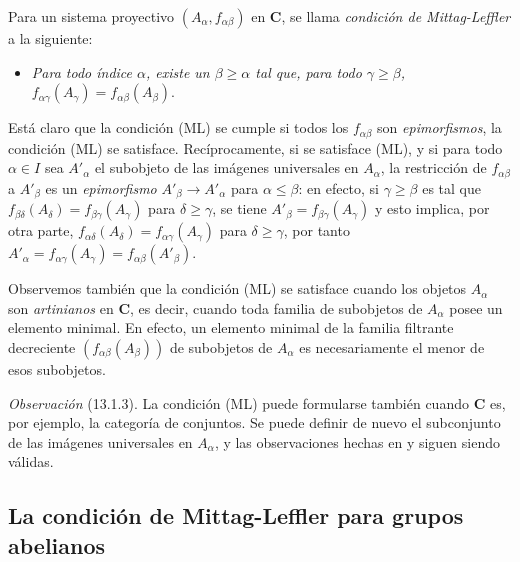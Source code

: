 \begin{env}[13.1.2]
\label{0.13.1.2}
\label{0.13.1.2-fr}
Para un sistema proyectivo $(A_\alpha,f_{\alpha\beta})$ en $\boldsymbol{C}$,
se llama \emph{condición de Mittag-Leffler} a la siguiente:
\begin{itemize}
  \item[(ML)]
  \emph{Para todo índice $\alpha$, existe un $\beta\geq\alpha$ tal
  que, para todo $\gamma\geq\beta$,}
  $f_{\alpha\gamma}(A_\gamma)=f_{\alpha\beta}(A_\beta)$.
\end{itemize}

Está claro que la condición (ML) se cumple si todos los
$f_{\alpha\beta}$ son \emph{epimorfismos}, la condición (ML) se satisface. Recíprocamente, si se satisface (ML), y si para todo $\alpha\in I$ sea $A'_\alpha$ el subobjeto de las imágenes
universales en $A_\alpha$, la restricción de $f_{\alpha\beta}$ a $A'_\beta$ es un \emph{epimorfismo}
$A'_\beta\to A'_\alpha$ para $\alpha\leq\beta$: en efecto, si $\gamma\geq\beta$ es tal que $f_{\beta\delta}(A_\delta)=f_{\beta\gamma}(A_\gamma)$ para $\delta\geq\gamma$, se tiene
$A'_\beta=f_{\beta\gamma}(A_\gamma)$ y esto implica, por otra parte, $f_{\alpha\delta}(A_\delta)=f_{\alpha\gamma}(A_\gamma)$ para $\delta\geq\gamma$, por tanto $A'_\alpha=f_{\alpha\gamma}(A_\gamma)=f_{\alpha\beta}(A'_\beta)$.

Observemos también que la condición (ML) se satisface cuando los objetos $A_\alpha$ son
\emph{artinianos} en $\boldsymbol{C}$, es decir, cuando toda familia de
subobjetos de $A_\alpha$ posee un elemento minimal.
En efecto, un elemento minimal de la familia filtrante decreciente
$(f_{\alpha\beta}(A_\beta))$ de subobjetos de $A_\alpha$
es necesariamente el menor de esos subobjetos.
\end{env}

\begin{remark}[13.1.3]
\label{0.13.1.3}
\label{0.13.1.3-fr}
\emph{Observación} (13.1.3).
La condición (ML) puede formularse también cuando $\boldsymbol{C}$ es, por
ejemplo, la categoría de conjuntos.
Se puede definir de nuevo el subconjunto de las imágenes universales en
$A_\alpha$, y las observaciones hechas en  y
 siguen siendo válidas.
\end{remark}

\subsection{La condición de Mittag-Leffler para grupos abelianos}
\label{subsection:0.13.2}
\label{subsection:0.13.2-fr}

